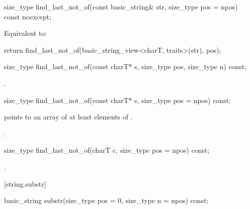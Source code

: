 %
\begin{itemdecl}
size_type find_last_not_of(const basic_string& str, size_type pos = npos) const noexcept;
\end{itemdecl}

\begin{itemdescr}
\pnum
\effects
Equivalent to:
\begin{codeblock}
return find_last_not_of(basic_string_view<charT, traits>(str), pos);
\end{codeblock}
\end{itemdescr}

%
\begin{itemdecl}
size_type find_last_not_of(const charT* s, size_type pos, size_type n) const;
\end{itemdecl}

\begin{itemdescr}
\pnum
\returns
{}.
\end{itemdescr}

%
\begin{itemdecl}
size_type find_last_not_of(const charT* s, size_type pos = npos) const;
\end{itemdecl}

\begin{itemdescr}
\pnum
\requires {} points to an array of at least 
elements of .

\pnum
\returns
{}.
\end{itemdescr}

%
\begin{itemdecl}
size_type find_last_not_of(charT c, size_type pos = npos) const;
\end{itemdecl}

\begin{itemdescr}
\pnum
\returns
{}.
\end{itemdescr}

[string.substr]{}

%
\begin{itemdecl}
basic_string substr(size_type pos = 0, size_type n = npos) const;
\end{itemdecl}

